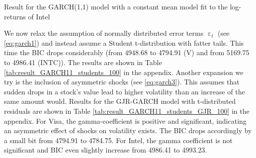 \begin{table}[h!]
    \centering
    
    \caption{Result for the GARCH(1,1) model with a constant mean model fit to the log-returns of Intel}
    \label{tab:INTC_result_GARCH11_100}
\end{table}{}
We now relax the assumption of normally distributed error terms $\upepsilon_t$ (see \ref{eq:garch1}) and instead assume a Student t-distribution with fatter tails. This time the BIC drops considerably (from 4948.68 to 4794.91 (V) and from 5169.75 to 4986.41 (INTC)). The results are shown in Table \ref{tab:result_GARCH11_students_100} in the appendix. 
%    
%    
Another expansion we try is the inclusion of asymmetric shocks (see \ref{eq:garch3}). This assumes that sudden drops in a stock's value lead to higher volatility than an increase of the same amount would. Results for the GJR-GARCH model with t-distributed residuals are shown in Table \ref{tab:result_GARCH11_students_GJR_100} in the appendix. For Visa, the gamma-coefficient is positive and significant, indicating an asymmetric effect of shocks on volatility exists. The BIC drops accordingly by a small bit from 4794.91 to 4784.75. For Intel, the gamma coefficient is not significant and BIC even slightly increase from 4986.41 to 4993.23.

